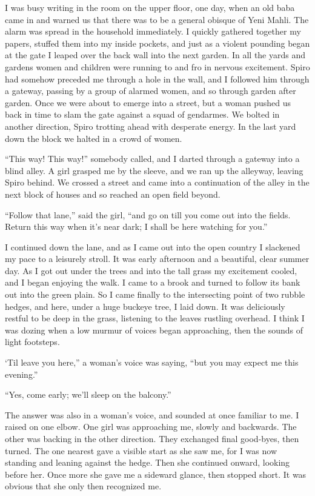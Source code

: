 \documentclass[a5paper,12pt]{book}
\begin{document}
I was busy writing in the room on the upper floor, one day, when an old baba came in and warned us that there was to be a general obisque of Yeni Mahli. The alarm was spread in the household immediately. I quickly gathered together my papers, stuffed them into my inside pockets, and just as a violent pounding began at the gate I leaped over the back wall into the next garden. In all the yards and gardens women and children were running to and fro in nervous excitement. Spiro had somehow preceded me through a hole in the wall, and I followed him through a gateway, passing by a group of alarmed women, and so through garden after garden. Once we were about to emerge into a street, but a woman pushed us back in time to slam the gate against a squad of gendarmes. We bolted in another direction, Spiro trotting ahead with desperate energy. In the last yard down the block we halted in a crowd of women. 

“This way! This way!” somebody called, and I darted through a gateway into a blind alley. A girl grasped me by the sleeve, and we ran up the alleyway, leaving Spiro behind. We crossed a street and came into a continuation of the alley in the next block of houses and so reached an open field beyond. 

“Follow that lane,” said the girl, “and go on till you come out into the fields. Return this way when it’s near dark; I shall be here watching for you.” 

I continued down the lane, and as I came out into the open country I slackened my pace to a leisurely stroll. It was early afternoon and a beautiful, clear summer day. As I got out under the trees and into the tall grass my excitement cooled, and I began enjoying the walk. I came to a brook and turned to follow its bank out into the green plain. So I came finally to the intersecting point of two rubble hedges, and here, under a huge buckeye tree, I laid down. It was deliciously restful to be deep in the grass, listening to the leaves rustling overhead. I think I was dozing when a low murmur of voices began approaching, then the sounds of light footsteps. 

‘Til leave you here,” a woman's voice was saying, “but you may expect me this evening.” 

“Yes, come early; we’ll sleep on the balcony.” 

The answer was also in a woman's voice, and sounded at once familiar to me. I raised on one elbow. One girl was approaching me, slowly and backwards. The other was backing in the other direction. They exchanged final good-byes, then turned. The one nearest gave a visible start as she saw me, for I was now standing and leaning against the hedge. Then she continued onward, looking before her. Once more she gave me a sideward glance, then stopped short. It was obvious that she only then recognized me. 
\end{document}
